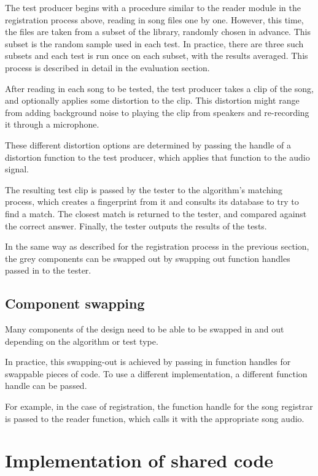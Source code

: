 \documentclass[12pt,a4paper,twoside,openright]{report}
\begin{document}
The test producer begins with a procedure similar to the reader module in the registration process above, reading in song files one by one. However, this time, the files are taken from a subset of the library, randomly chosen in advance. This subset is the random sample used in each test. In practice, there are three such subsets and each test is run once on each subset, with the results averaged. This process is described in detail in the evaluation section.

After reading in each song to be tested, the test producer takes a clip of the song, and optionally applies some distortion to the clip. This distortion might range from adding background noise to playing the clip from speakers and re-recording it through a microphone.

These different distortion options are determined by passing the handle of a distortion function to the test producer, which applies that function to the audio signal.

The resulting test clip is passed by the tester to the algorithm's matching process, which creates a fingerprint from it and consults its database to try to find a match. The closest match is returned to the tester, and compared against the correct answer. Finally, the tester outputs the results of the tests.

In the same way as described for the registration process in the previous section, the grey components can be swapped out by swapping out function handles passed in to the tester.


\subsection{Component swapping}

Many components of the design need to be able to be swapped in and out depending on the algorithm or test type. 

In practice, this swapping-out is achieved by passing in function handles for swappable pieces of code. To use a different implementation, a different function handle can be passed.

For example, in the case of registration, the function handle for the song registrar is passed to the reader function, which calls it with the appropriate song audio.


\section{Implementation of shared code}
\end{document}
